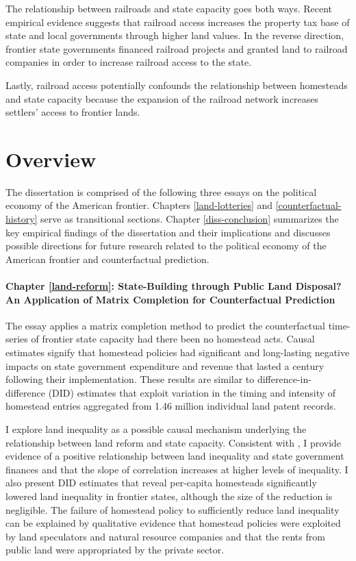 The relationship between railroads and state capacity goes both ways. Recent empirical evidence suggests that railroad access increases the property tax base of state and local governments through higher land values. In the reverse direction, frontier state governments financed railroad projects and granted land to railroad companies in order to increase railroad access to the state. 

Lastly, railroad access potentially confounds the relationship between homesteads and state capacity because the expansion of the railroad network increases settlers' access to frontier lands. 

\section{Overview}

The dissertation is comprised of the following three essays on the political economy of the American frontier. Chapters \ref{land-lotteries} and \ref{counterfactual-history} serve as transitional sections. Chapter \ref{diss-conclusion} summarizes the key empirical findings of the dissertation and their implications and discusses possible directions for future research related to the political economy of the American frontier and counterfactual prediction.

\paragraph{Chapter \ref{land-reform}: State-Building through Public Land Disposal? An Application of Matrix Completion for Counterfactual Prediction}
The essay applies a matrix completion method to predict the counterfactual time-series of frontier state capacity had there been no homestead acts. Causal estimates signify that homestead policies had significant and long-lasting negative impacts on state government expenditure and revenue that lasted a century following their implementation. These results are similar to difference-in-difference (DID) estimates that exploit variation in the timing and intensity of homestead entries aggregated from 1.46 million individual land patent records.

I explore land inequality as a possible causal mechanism underlying the relationship between land reform and state capacity. Consistent with \citet{meltzer1981rational}, I provide evidence of a positive relationship between land inequality and state government finances and that the slope of correlation increases at higher levels of inequality. I also present DID estimates that reveal per-capita homesteads significantly lowered land inequality in frontier states, although the size of the reduction is negligible. The failure of homestead policy to sufficiently reduce land inequality can be explained by qualitative evidence that homestead policies were exploited by land speculators and natural resource companies and that the rents from public land were appropriated by the private sector. 

